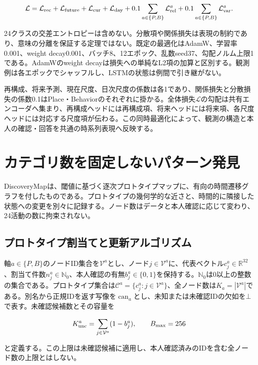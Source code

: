 \[
\mathcal L=\mathcal L_{\rm rec}+\mathcal L_{\rm future}
+\mathcal L_{\rm cur}+\mathcal L_{\rm day}
+0.1\sum_{a\in\{P,B\}}\mathcal L_{\rm rel}^{a}
+0.1\sum_{a\in\{P,B\}}\mathcal L_{\rm var}^{a}.
\]

24クラスの交差エントロピーは含めない。分散項や関係損失は表現の制約であり、意味の分離を保証する定理ではない。既定の最適化はAdamW\autocite{loshchilov2019adamw}、学習率0.001、weight decay0.001、バッチ8、12エポック、乱数seed37、勾配ノルム上限1である。AdamWのweight decayは損失への単純なL2項の加算と区別する。観測例は各エポックでシャッフルし、LSTMの状態は例間で引き継がない。

再構成、将来予測、現在尺度、日次尺度の係数は各1であり、関係損失と分散損失の係数0.1はPlace・Behaviorのそれぞれに掛かる。全体損失\(\mathcal L\)の勾配は共有エンコーダへ集まり、再構成ヘッドには再構成項、将来ヘッドには将来項、各尺度ヘッドには対応する尺度項が伝わる。この同時最適化によって、観測の構造と本人の確認・回答を共通の時系列表現へ反映する。

\section{カテゴリ数を固定しないパターン発見}
\label{sec:pattern-discovery}

DiscoveryMapは、閾値に基づく逐次プロトタイプマップに、有向の時間遷移グラフを付したものである。プロトタイプの幾何学的な近さと、時間的に隣接した状態への変更を別々に記録する。ノード数はデータと本人確認に応じて変わり、24活動の数に拘束されない。

\subsection{プロトタイプ割当てと更新アルゴリズム}

軸\(a\in\{P,B\}\)のノードID集合を\(\mathcal V^a\)とし、ノード\(j\in\mathcal V^a\)に、代表ベクトル\(c_j^a\in\mathbb R^{32}\)、割当て件数\(n_j^a\in\mathbb N_0\)、本人確認の有無\(b_j^a\in\{0,1\}\)を保持する。\(\mathbb N_0\)は0以上の整数の集合である。プロトタイプ集合は\(\mathcal C^a=\{c_j^a:j\in\mathcal V^a\}\)、全ノード数は\(K_a=|\mathcal V^a|\)である。別名から正規IDを返す写像を\(\operatorname{can}_a\)とし、未知または未確認IDの欠如を\(\bot\)で表す。未確認候補数とその容量を

\[
K_{\rm unc}^a=\sum_{j\in\mathcal V^a}(1-b_j^a),\qquad
B_{\max}=256
\]

と定義する。この上限は未確認候補に適用し、本人確認済みのIDを含む全ノード数の上限とはしない。

